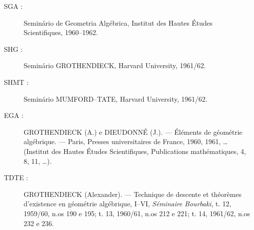 \begin{description}
\item[SGA :] Seminário de Geometria Algébrica, Institut des Hautes Études
Scientifiques, 1960--1962.

\item[SHG :] Seminário GROTHENDIECK, Harvard University, 1961/62.

\item[SHMT :] Seminário MUMFORD--TATE, Harvard University, 1961/62.

\item[EGA :] GROTHENDIECK (A.) e DIEUDONNÉ (J.). --- Éléments de géométrie
algébrique. --- Paris, Presses universitaires de France, 1960, 1961, …
(Institut des Hautes Études Scientifiques, Publications mathématiques, 4, 8,
11, …).

\item[TDTE :] GROTHENDIECK (Alexander). --- Technique de descente et théorèmes
d'existence en géométrie algébrique, I--VI, \emph{Séminaire Bourbaki}, t. 12,
1959/60, n.os 190 e 195; t. 13, 1960/61, n.os 212 e 221; t. 14, 1961/62,
n.os 232 e 236.
\end{description}

\par
